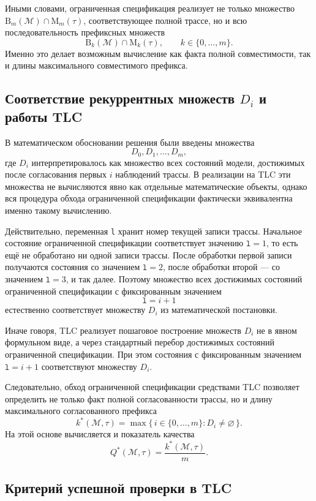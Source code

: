 Иными словами, ограниченная спецификация реализует не только множество
$\mathrm{B}_m(\mathcal{M}) \cap \mathrm{M}_m(\tau)$, соответствующее полной
трассе, но и всю последовательность префиксных множеств
\[
\mathrm{B}_k(\mathcal{M}) \cap \mathrm{M}_k(\tau),
\qquad
k \in \{0,\dots,m\}.
\]
Именно это делает возможным вычисление как факта полной совместимости, так и
длины максимального совместимого префикса.

\subsection{Соответствие рекуррентных множеств $D_i$ и работы TLC}

В математическом обосновании решения были введены множества
\[
D_0, D_1, \dots, D_m,
\]
где $D_i$ интерпретировалось как множество всех состояний модели, достижимых
после согласования первых $i$ наблюдений трассы. В реализации на TLC эти
множества не вычисляются явно как отдельные математические объекты, однако
вся процедура обхода ограниченной спецификации фактически эквивалентна именно
такому вычислению.

Действительно, переменная \texttt{l} хранит номер текущей записи трассы.
Начальное состояние ограниченной спецификации соответствует значению
$\texttt{l} = 1$, то есть ещё не обработано ни одной записи трассы. После
обработки первой записи получаются состояния со значением $\texttt{l} = 2$,
после обработки второй --- со значением $\texttt{l} = 3$, и так далее. Поэтому
множество всех достижимых состояний ограниченной спецификации с фиксированным
значением
\[
\texttt{l} = i+1
\]
естественно соответствует множеству $D_i$ из математической постановки.

Иначе говоря, TLC реализует пошаговое построение множеств $D_i$ не в явном
формульном виде, а через стандартный перебор достижимых состояний ограниченной
спецификации. При этом состояния с фиксированным значением $\texttt{l}=i+1$
соответствуют множеству $D_i$.

Следовательно, обход ограниченной спецификации средствами TLC позволяет
определить не только факт полной согласованности трассы, но и длину
максимального согласованного префикса
\[
k^*(\mathcal{M},\tau)=\max\{\, i \in \{0,\dots,m\} : D_i \neq \varnothing \,\}.
\]
На этой основе вычисляется и показатель качества
\[
Q^*(\mathcal{M},\tau)=\frac{k^*(\mathcal{M},\tau)}{m}.
\]

\subsection{Критерий успешной проверки в TLC}

